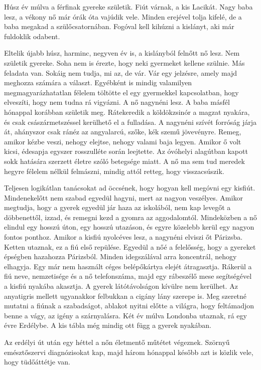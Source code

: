 Húsz év múlva a férfinak gyereke születik. Fiút várnak, a kis Lacikát.
Nagy baba lesz, a vékony nő már órák óta vajúdik vele. Minden
erejével tolja kifelé, de a baba megakad a szülőcsatornában. Fogóval
kell kihúzni a kislányt, aki már fuldoklik odabent.

Eltelik újabb húsz, harminc, negyven év is, a kislányból felnőtt nő
lesz. Nem születik gyereke. Soha nem is érezte, hogy neki gyermeket
kellene szülnie. Más feladata van. Sokáig nem tudja, mi az, de vár.
Vár egy jelzésre, amely majd meghozza számára a választ. Egyébként
is mindig valamilyen megmagyarázhatatlan félelem töltötte el egy
gyermekkel kapcsolatban, hogy elveszíti, hogy nem tudna rá vigyázni.
A nő nagynéni lesz. A baba másfél hónappal korábban születik meg.
Rátekeredik a köldökzsinór a magzat nyakára, és csak császármetszéssel
kerülhető el a fulladása. A nagynéni szívét forróság járja át, ahányszor
csak ránéz az angyalarcú, szőke, kék szemű jövevényre. Remeg,
amikor kézbe veszi, nehogy elejtse, nehogy valami baja legyen. Amikor
ő volt kicsi, édesapja egyszer rosszulléte során leejtette. Az óvóhelyi
alagútban kapott sokk hatására szerzett életre szóló betegsége miatt.
A nő ma sem tud meredek hegyre félelem nélkül felmászni, mindig
attól retteg, hogy visszacsúszik.

Teljesen logikátlan tanácsokat ad öccsének, hogy hogyan kell megóvni
egy kisfiút. Mindenekelőtt nem szabad egyedül hagyni, mert az
nagyon veszélyes. Amikor megtudja, hogy a gyerek egyedül jár haza
az iskolából, nem kap levegőt a döbbenettől, izzad, és remegni kezd
a gyomra az aggodalomtól. Mindeközben a nő elindul egy hosszú
úton, egy hosszú utazáson, és egyre közelebb kerül egy nagyon fontos
ponthoz. Amikor a kisfiú nyolcéves lesz, a nagynéni elviszi őt Párizsba.
Ketten utaznak, ez a fiú első repülése. Egyedül a nőé a felelősség,
hogy a gyereket épségben hazahozza Párizsból. Minden idegszálával
arra koncentrál, nehogy elhagyja. Egy már nem használt céges belépőkártya
elejét átragasztja. Rákerül a fiú neve, nemzetisége és a nő
telefonszáma, majd egy rábeszélő mese segítségével a kisfiú nyakába
akasztja. A gyerek látótávolságon kívülre nem kerülhet. Az anyatigris
mellett ugyanakkor felbukkan a cigány lány szerepe is. Meg szeretné
mutatni a fiúnak a szabadságot, ablakot nyitni előtte a világra, hogy
feltámadjon benne a vágy, az igény a szárnyalásra. Két év múlva Londonba
utaznak, rá egy évre Erdélybe. A kis tábla még mindig ott függ
a gyerek nyakában.

Az erdélyi út után egy héttel a nőn életmentő műtétet végeznek.
Szörnyű emésztőszervi diagnózisokat kap, majd három hónappal később
azt is közlik vele, hogy tüdőáttétje van.

